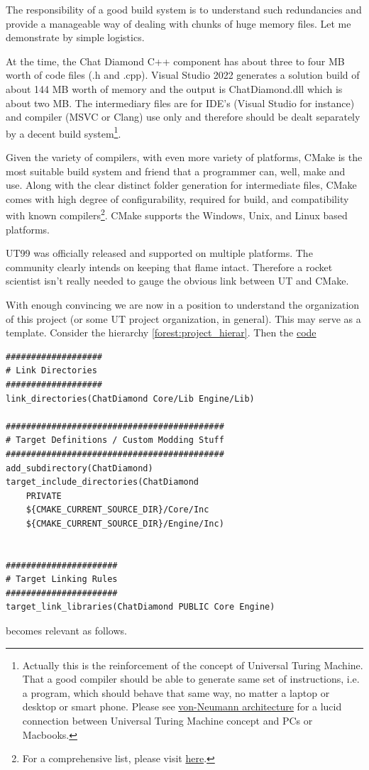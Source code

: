 \documentclass{article}
\theoremstyle{definition}
\newenvironment{dummy}{}{}
\newcommand{\FileColor}[1]{{\color{Purple} #1}}
\begin{document}
The responsibility of a good build system is to understand such redundancies and provide a manageable way of dealing with chunks of huge memory files.
Let me demonstrate by simple logistics.  

At the time, the Chat Diamond C++ component has about three to four MB worth of code files (.h and .cpp).  
Visual Studio 2022 generates a solution build of about 144 MB worth of memory and the output is \FileColor{ChatDiamond.dll} which is about two MB.  The intermediary files are 
for IDE's (Visual Studio for instance) and compiler (MSVC or Clang) use only and therefore should be dealt separately by a decent build system\footnote{Actually this is the
reinforcement of the concept of Universal Turing Machine.  That a good compiler should be able to generate same set of instructions, i.e. a program, 
which should behave that same way, no matter a laptop or desktop or smart phone.  Please see \href{https://en.wikipedia.org/wiki/Von_Neumann_architecture}{von-Neumann architecture} for a lucid connection 
between Universal Turing Machine concept and PCs or Macbooks.}.

Given the variety of compilers, with even more variety of platforms, CMake is the most suitable build system and friend that a programmer can, well, make and use.  Along with the clear 
distinct folder generation for intermediate files, CMake comes with high degree of configurability, required for build, and compatibility with known compilers\footnote{For a comprehensive list, please visit \href{https://cmake.org/cmake/help/latest/manual/cmake-compile-features.7.html}{here}.}.  
CMake supports the Windows, Unix, and Linux based platforms.

UT99 was officially released and supported on multiple platforms.  The community clearly intends on keeping that flame intact.  Therefore a rocket scientist isn't really needed to gauge the obvious link 
between UT and CMake.

With enough convincing we are now in a position to understand the organization of this project (or some UT project organization, in general).  This may serve as a template.  
Consider the hierarchy \ref{forest:project_hierar}.  Then the \href{https://github.com/ravimohan1991/ChatDiamond/blob/f7950b2591b93a54600459ec58d7ddf57fe9218d/UTNativeEssentials/CMakeLists.txt#L201-L216}{code}

\lstset{language=[5.0]Lua}
\begin{dummy}
\begin{lstlisting}[frame=single]
###################
# Link Directories
###################
link_directories(ChatDiamond Core/Lib Engine/Lib)

###########################################
# Target Definitions / Custom Modding Stuff
###########################################
add_subdirectory(ChatDiamond)
target_include_directories(ChatDiamond
    PRIVATE
    ${CMAKE_CURRENT_SOURCE_DIR}/Core/Inc
    ${CMAKE_CURRENT_SOURCE_DIR}/Engine/Inc)


######################
# Target Linking Rules
######################
target_link_libraries(ChatDiamond PUBLIC Core Engine)
\end{lstlisting}
\end{dummy}
becomes relevant as follows.
\end{document}
